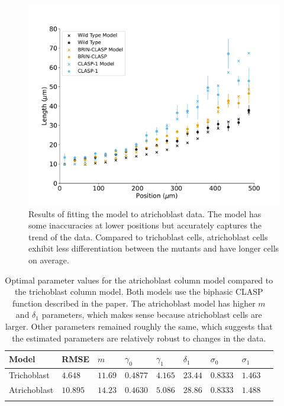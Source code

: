 \documentclass[referee,pdflatex,sn-mathphys-num]{sn-jnl}
\begin{document}
\begin{appendices}
\begin{figure}
  \centering
  \includegraphics[width=\textwidth]{column-atrichoblast-fit.pdf}
  \caption{Results of fitting the model to atrichoblast data.
  The model has some inaccuracies at lower positions but accurately captures the trend of the data.
Compared to trichoblast cells, atrichoblast cells exhibit less differentiation between the mutants and have longer cells on average. }
  \label{column-atrichoblast-fit}
\end{figure}

\begin{table}[!ht]
\centering
\label{column-atrichoblast-parameters}
\begin{tabular}{@{}lllllllll@{}}
\toprule
Model & RMSE & $m$ & $\gamma_{0}$ & $\gamma_{1}$ & $\delta_{1}$ & $\sigma_{0}$ & $\sigma_{1}$ \\
\midrule
Trichoblast & $4.648$ & $11.69$ & $0.4877$ & $4.165$ & $23.44$ & $0.8333$ & $1.463$ \\
Atrichoblast & $10.895$ & $14.23$ & $0.4630$ & $5.086$ & $28.86$ & $0.8333$ & $1.488$ \\
\botrule
\caption{Optimal parameter values for the atrichoblast column model compared to the trichoblast column model.
Both models use the biphasic CLASP function described in the paper.
The atrichoblast model has higher $m$ and $\delta_{1}$ parameters, which makes sense because atrichoblast cells are larger.
Other parameters remained roughly the same, which suggests that the estimated parameters are relatively robust to changes in the data.} 

\end{tabular}
\end{table}

\end{appendices}
\end{document}
